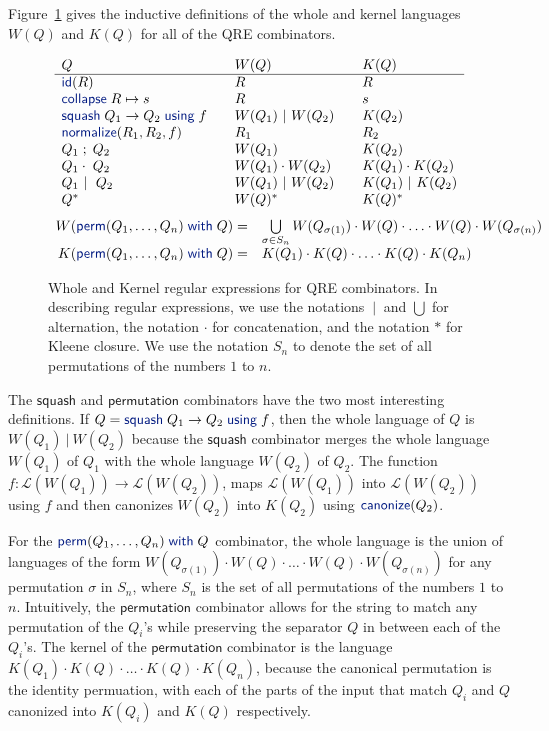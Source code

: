 \documentclass[acmsmall,review,anonymous]{acmart}
\newcommand{\kw}[1]{\textcolor{dkblue}{\ensuremath{\mathsf{#1}}}}
\newcommand{\collapse}[2]{\ensuremath{\kw{collapse} \; #1 \mapsto #2}}
\newcommand{\squash}[3]{\ensuremath{\kw{squash} \; #1 \rightarrow #2\; \kw{using} \; #3}}
\newcommand{\perm}[2]{\ensuremath{\kw{perm}(#1)\; \kw{with}\; #2}}
\newcommand{\normalize}[3]{\ensuremath{\kw{normalize}(#1, #2, #3)}}
\newcommand{\sep}{\ensuremath{\ | \ }}
\newcommand{\canonize}{\ensuremath{\kw{canonize}}}
\newcommand{\id}{\ensuremath{\kw{id}}}
\begin{document}
Figure~\ref{fig:wk} gives the inductive definitions of the whole and
kernel languages $W(Q)$ and $K(Q)$ for all of the QRE combinators.
\begin{figure}[t]
\centering
\[
\begin{array}{l@{\quad\quad}l@{\quad\quad}l}

Q & W(Q) & K(Q) \\ \hline
\id(R) & R & R \\
\collapse{R}{s} & R & s \\
\squash{Q_1}{Q_2}{f} & W(Q_1) \sep W(Q_2) & K(Q_2) \\
\normalize{R_1}{R_2}{f} & R_1 & R_2 \\
Q_1 \; ; \; Q_2 & W(Q_1) & K(Q_2) \\
Q_1 \cdot\; Q_2 & W(Q_1) \cdot W(Q_2) & K(Q_1) \cdot K(Q_2) \\
Q_1 \sep \; Q_2 & W(Q_1) \sep W(Q_2) & K(Q_1) \sep K(Q_2) \\
Q^* & W(Q)^* & K(Q)^* \\
\end{array}
\]
\[
\begin{array}{r@{\quad}l}
W( \perm{Q_1, \ldots, Q_n}{Q} ) = &
\bigcup \limits_{\sigma \in S_n} W(Q_{\sigma(1)}) \cdot W(Q) \cdot \ldots \cdot
W(Q) \cdot W(Q_{\sigma(n)})\\
K( \perm{Q_1, \ldots, Q_n}{Q} ) = & K(Q_1) \cdot K(Q) \cdot \ldots \cdot K(Q)
\cdot K(Q_n)
\end{array}
\]
\caption{Whole and Kernel regular expressions for QRE combinators. 
In describing regular expressions, we use the notations $\sep$ and $\bigcup$ for
alternation, the notation $\cdot$ for concatenation, and the notation
$*$ for Kleene closure.  
We use the notation $S_n$ to denote the set of all permutations of the
numbers $1$ to $n$.
}
\label{fig:wk}
\end{figure}
The \kw{squash} and \kw{permutation} combinators have the two most
interesting definitions. If $Q = \squash{Q_1}{Q_2}{f}$, then the whole language
of $Q$ is $W(Q_1) \sep W(Q_2)$ because the \kw{squash} combinator
merges the whole language $W(Q_1)$ of $Q_1$ with the whole language $W(Q_2)$ of $Q_2$.
The function $f : \mathcal{L}(W(Q_1)) \longrightarrow \mathcal{L}(W(Q_2))$,
maps $\mathcal{L}(W(Q_1))$ into $\mathcal{L}(W(Q_2))$ using $f$ and then
canonizes $W(Q_2)$ into $K(Q_2)$ using $\canonize(Q_2)$.

For the $\perm{Q_1, \ldots, Q_n}{Q}$ combinator, the whole language is the
union of languages of the form $W(Q_{\sigma(1)}) \cdot W(Q) \cdot \ldots \cdot
W(Q) \cdot W(Q_{\sigma(n)})$ for any permutation $\sigma$ in $S_n$, where
$S_n$ is the set of all permutations of the numbers $1$ to $n$. Intuitively,
the \kw{permutation} combinator allows for the string to match any
permutation of the $Q_i$'s while preserving the separator $Q$ in
between each of the $Q_i$'s. The kernel of the \kw{permutation} combinator
is the language $K(Q_1) \cdot K(Q) \cdot \ldots \cdot K(Q) \cdot K(Q_n)$,
because the canonical permutation is the identity permuation, with each of the
parts of the input that match $Q_i$ and $Q$ canonized into $K(Q_i)$ and $K(Q)$
respectively.
\end{document}
